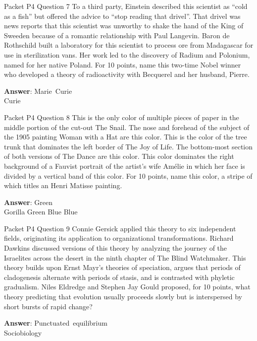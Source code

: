 \begin{frame}{Packet P4 Question 7}
To a third party, Einstein described this scientist as ``cold as a fish'' but offered the advice to ``stop reading that drivel''.  That drivel was news reports that this scientist was unworthy to shake the hand of the King of Sweeden because of a romantic relationship with Paul Langevin.  Baron de Rothschild built a laboratory for this scientist to process ore from Madagascar for use in sterilization vans.  Her work led to the discovery of Radium and Polonium, named       for her native Poland.  For 10 points,   name this two-time Nobel winner who developed a theory of radioactivity with Becquerel and her husband,   Pierre.

\textbf{Answer}: Marie\ Curie\\
 Curie
\end{frame}

\begin{frame}{Packet P4 Question 8}
This is the only color   of multiple pieces of paper in the middle portion of the cut-out The Snail. The nose and forehead of the subject of the 1905 painting Woman with a Hat are this color. This is the color of the tree trunk that dominates the left border of The Joy of Life. The bottom-most section of both versions of The Dance are this color. This color dominates the right background of a Fauvist portrait of the artist’s wife Amélie in which her face is divided by a vertical band of this color. For 10 points, name this color, a stripe of which titles an Henri Matisse painting.      

\textbf{Answer}: Green\\
 Gorilla
 Green
 Blue
 Blue
\end{frame}

\begin{frame}{Packet P4 Question 9}
Connie Gersick applied this theory to six independent fields, originating its application to organizational transformations. Richard Dawkins discussed   versions of this theory by analyzing the journey of the Israelites across the desert in the ninth chapter of The Blind Watchmaker. This theory builds upon   Ernst Mayr’s theories of speciation,   argues that periods of cladogenesis alternate   with periods of stasis, and is contrasted with phyletic gradualism. Niles   Eldredge and Stephen Jay Gould proposed, for 10 points, what theory predicting that evolution usually proceeds slowly but is interspersed by short bursts of rapid change?

\textbf{Answer}: Punctuated\ equilibrium\\
 Sociobiology
\end{frame}

